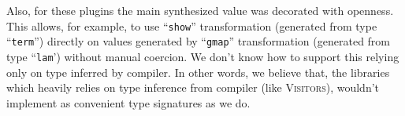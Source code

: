 Also, for these plugins the main synthesized value was decorated with openness. This allows, for example, to use ``\lstinline|show|'' transformation (generated from type ``\lstinline|term|'') directly on values generated by ``\lstinline|gmap|'' transformation (generated from type ``\lstinline|lam|') without manual coercion. We don't know how to support this relying only on type inferred by compiler. In other words, we believe that, the libraries which heavily  relies on type inference from compiler (like \textsc{Visitors}), wouldn't 
implement as convenient type signatures as we do.






